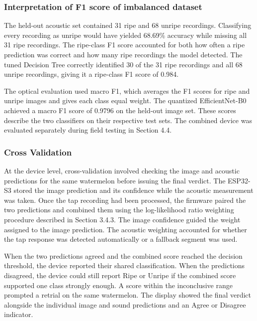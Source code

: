 \begin{thesisprose}
\subsubsection*{Interpretation of F1 score of imbalanced dataset}

The held-out acoustic set contained 31 ripe and 68 unripe recordings. Classifying every recording as unripe would have yielded 68.69\% accuracy while missing all 31 ripe recordings. The ripe-class F1 score accounted for both how often a ripe prediction was correct and how many ripe recordings the model detected. The tuned Decision Tree correctly identified 30 of the 31 ripe recordings and all 68 unripe recordings, giving it a ripe-class F1 score of 0.984.

The optical evaluation used macro F1, which averages the F1 scores for ripe and unripe images and gives each class equal weight. The quantized EfficientNet-B0 achieved a macro F1 score of 0.9796 on the held-out image set. These scores describe the two classifiers on their respective test sets. The combined device was evaluated separately during field testing in Section 4.4.

\subsubsection*{Cross Validation}

At the device level, cross-validation involved checking the image and acoustic predictions for the same watermelon before issuing the final verdict. The ESP32-S3 stored the image prediction and its confidence while the acoustic measurement was taken. Once the tap recording had been processed, the firmware paired the two predictions and combined them using the log-likelihood ratio weighting procedure described in Section 3.4.3. The image confidence guided the weight assigned to the image prediction. The acoustic weighting accounted for whether the tap response was detected automatically or a fallback segment was used.

When the two predictions agreed and the combined score reached the decision threshold, the device reported their shared classification. When the predictions disagreed, the device could still report Ripe or Unripe if the combined score supported one class strongly enough. A score within the inconclusive range prompted a retrial on the same watermelon. The display showed the final verdict alongside the individual image and sound predictions and an Agree or Disagree indicator.


\end{thesisprose}

